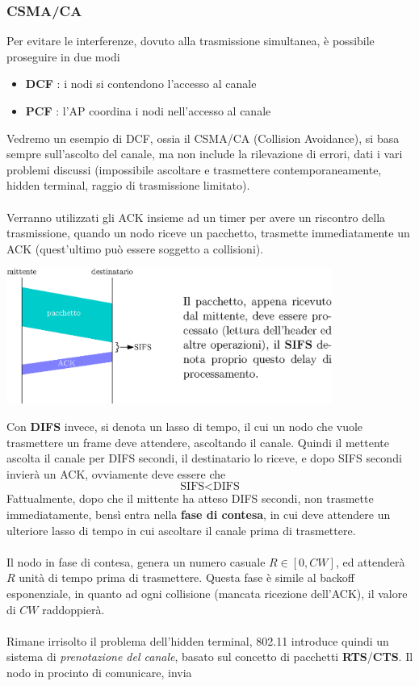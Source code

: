 \documentclass[12pt, letterpaper]{article}
\newcommand{\acc}{\\\hphantom{}\\}
\begin{document}
\subsubsection{CSMA/CA}
Per evitare le interferenze, dovuto alla trasmissione simultanea, è possibile proseguire in due modi\begin{itemize}
    \item \textbf{DCF} : i nodi si contendono l'accesso al canale
    \item \textbf{PCF} : l'AP coordina i nodi nell'accesso al canale
\end{itemize} 
Vedremo un esempio di DCF, ossia il CSMA/CA (Collision Avoidance), si basa sempre sull'ascolto del canale, ma non 
include la rilevazione di errori, dati i vari problemi discussi (impossibile ascoltare e trasmettere contemporaneamente, 
hidden terminal, raggio di trasmissione limitato).\acc 
Verranno utilizzati gli ACK insieme ad un timer per avere un riscontro della trasmissione, quando un nodo riceve un 
pacchetto, trasmette immediatamente un ACK (quest'ultimo può essere soggetto a collisioni).\begin{center}
    \includegraphics[width=0.8\textwidth ]{images/CSMA-CA.eps}
\end{center}
Con \textbf{DIFS} invece, si denota un lasso di tempo, il cui un nodo che vuole trasmettere un frame deve 
attendere, ascoltando il canale. Quindi il mettente ascolta il canale per DIFS secondi, il destinatario lo riceve, 
e dopo SIFS secondi invierà un ACK, ovviamente deve essere che $$\text{SIFS}<\text{DIFS}$$
Fattualmente, dopo che il mittente ha atteso DIFS secondi, non trasmette immediatamente, bensì entra nella 
\textbf{fase di contesa}, in cui deve attendere un ulteriore lasso di tempo in cui ascoltare il canale prima 
di trasmettere. \acc Il nodo in fase di contesa, genera un numero casuale $R\in[0,CW]$, ed attenderà 
$R$ unità di tempo prima di trasmettere. Questa fase è simile al backoff esponenziale, in quanto ad ogni 
collisione (mancata ricezione dell'ACK), il valore di $CW$ raddoppierà.\acc 
Rimane irrisolto il problema dell'hidden terminal, 802.11 introduce quindi un sistema di \textit{prenotazione del 
canale}, basato sul concetto di pacchetti \textbf{RTS}/\textbf{CTS}. Il nodo in procinto di comunicare, invia 
\end{document}
